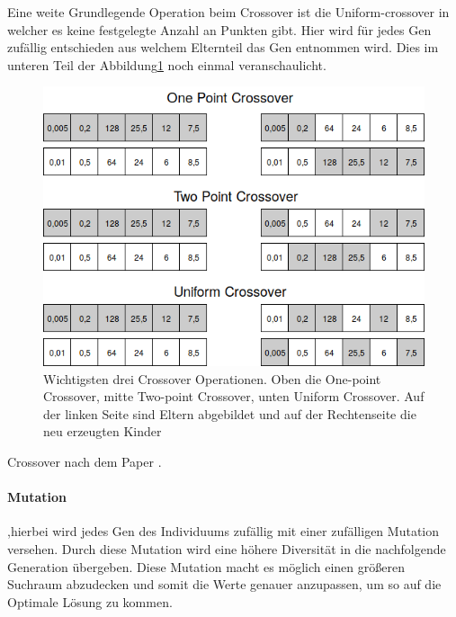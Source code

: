 Eine weite Grundlegende Operation beim Crossover ist die Uniform-crossover \cite{Syswerda1989} in welcher es keine festgelegte Anzahl an Punkten gibt. Hier wird für jedes Gen zufällig entschieden aus welchem Elternteil das Gen entnommen wird.
Dies im unteren Teil der Abbildung\ref{fig:chromoson_crossover} noch einmal veranschaulicht.

\begin{figure}[H]
  \centering  
  \includegraphics[scale=0.5]{img/crossover_gene.png}
  \caption{Wichtigsten drei Crossover Operationen. Oben die One-point Crossover, mitte Two-point Crossover, unten Uniform Crossover. Auf der linken Seite sind Eltern abgebildet und auf der Rechtenseite die neu erzeugten Kinder}
  \label{fig:chromoson_crossover}
\end{figure}

Crossover nach dem Paper \cite{Umbarkar2015}.




\paragraph{Mutation},hierbei wird jedes Gen des Individuums zufällig mit einer zufälligen Mutation versehen. Durch diese Mutation wird eine höhere Diversität in die nachfolgende Generation übergeben. Diese Mutation macht es möglich einen größeren Suchraum abzudecken und somit die Werte genauer anzupassen, um so auf die Optimale Lösung zu kommen. 

